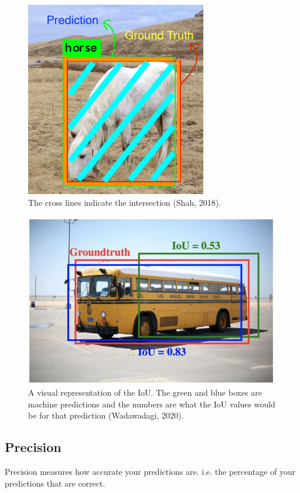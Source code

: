 \documentclass[]{article}
\begin{document}
\begin{figure}[!h]
	\includegraphics[scale=0.75]{iou3}
	\caption{The cross lines indicate the intersection (Shah, 2018).}
	\label{Fig:Race}
\end{figure}


\begin{figure}[!h]
	\includegraphics[scale=0.75]{iou}
	\caption{A visual representation of the IoU.  The green and blue boxes are machine predictions and the numbers are what the IoU values would be for that prediction (Wadawadagi, 2020).}
	\label{Fig:Race}
\end{figure}

\subsection{Precision}

Precision measures how accurate your predictions are. i.e. the percentage of your predictions that are correct.
\end{document}
